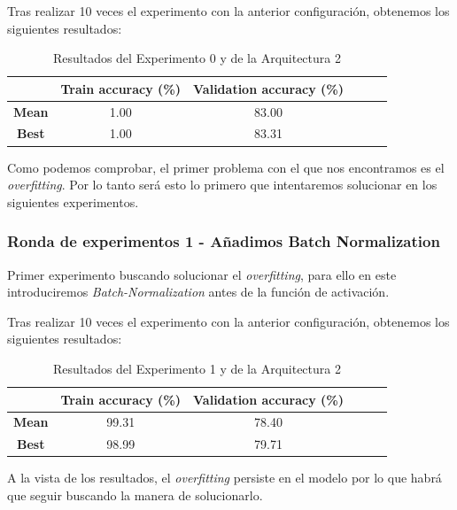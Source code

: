 \documentclass{article}
\begin{document}
			Tras realizar 10 veces el experimento con la anterior configuraci\'on, obtenemos los siguientes resultados:
			\begin{table}[!h]
				\begin{center}
					\begin{tabular}{ c | c | c | c | c | c |}
						\ & \textbf{Train accuracy (\%)} & \textbf{Validation accuracy (\%)}  \\ \hline
						\textbf{Mean} & 1.00 & 83.00 \\ \hline
						\textbf{Best} & 1.00 & 83.31 \\ \hline
					\end{tabular}
					\caption{Resultados del Experimento 0 y de la Arquitectura 2}
					\label{tab:res-j-a0-e0}
				\end{center}
			\end{table}
		    
		    Como podemos comprobar, el primer problema con el que nos encontramos es el \textit{overfitting}. Por lo tanto ser\'a esto lo primero que intentaremos solucionar en los siguientes experimentos.

      \subsubsection{Ronda de experimentos 1 - A\~{n}adimos Batch Normalization}
		\label{j-s-a0-e1} %
			Primer experimento buscando solucionar el \textit{overfitting}, para ello en este introduciremos \textit{Batch-Normalization} antes de la funci\'on de activaci\'on.
			
			
			Tras realizar 10 veces el experimento con la anterior configuraci\'on, obtenemos los siguientes resultados:
			\begin{table}[!h]
				\begin{center}
					\begin{tabular}{ c | c | c | c | c | c |}
						\ & \textbf{Train accuracy (\%)} & \textbf{Validation accuracy (\%)}  \\ \hline
						\textbf{Mean} & 99.31 & 78.40 \\ \hline
						\textbf{Best} & 98.99 & 79.71 \\ \hline
					\end{tabular}
					\caption{Resultados del Experimento 1 y de la Arquitectura 2}
					\label{tab:res-j-a0-e1}
				\end{center}
			\end{table}
		    \newpage
		    A la vista de los resultados, el \textit{overfitting} persiste en el modelo por lo que habr\'a que seguir buscando la manera de solucionarlo.
\end{document}
